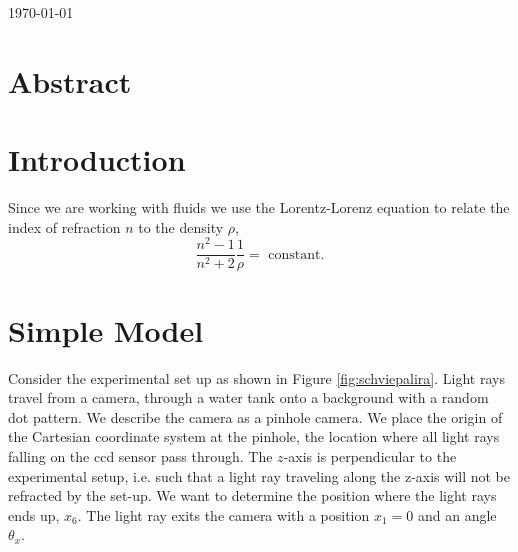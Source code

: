 \documentclass{article}
\begin{document}
\today
\section{Abstract}

\section{Introduction}


Since we are working with fluids we use the Lorentz-Lorenz equation to relate the index of refraction $n$ to the density $\rho$,
\begin{equation}
 	\frac{n^2-1}{n^2+2} \frac{1}{\rho} = \mbox{ constant}.
\end{equation}

\section{Simple Model}
Consider the experimental set up as shown in Figure \ref{fig:schviepalira}. Light rays travel from a camera, through a water tank onto a background with a random dot pattern.  We describe the camera as a pinhole camera. We place the origin of the Cartesian coordinate system at the pinhole, the location where all light rays falling on the ccd sensor pass through. The $z$-axis is perpendicular to the experimental setup, i.e. such that a light ray traveling along the z-axis will not be refracted by the set-up. We want to determine the position where the light rays ends up, $x_6$. The light ray exits the camera with a position $x_1 = 0$ and an angle $\theta_x$. %

%	
\end{document}
